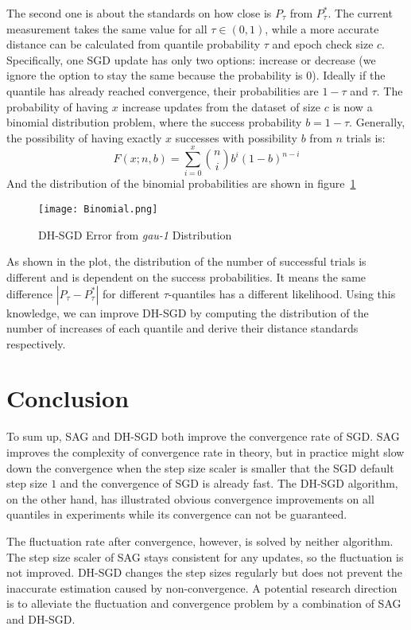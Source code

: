 The second one is about the standards on how close is $P_\tau$ from $P_\tau^*$. The current measurement takes the same value for all $\tau \in (0,1)$, while a more accurate distance can be calculated from quantile probability $\tau$ and epoch check size $c$. Specifically, one SGD update has only two options: increase or decrease (we ignore the option to stay the same because the probability is $0$). Ideally if the quantile has already reached convergence, their probabilities are $1-\tau$ and $\tau$. The probability of having $x$ increase updates from the dataset of size $c$ is now a binomial distribution problem, where the success probability $b = 1-\tau$.
Generally, the possibility of having exactly $x$ successes with possibility $b$ from $n$ trials is:
\begin{equation}
    F(x ; n,b)=\sum_{i=0}^{ x}{\binom{n}{i}} b^{i}(1-b)^{n-i}
\end{equation}
And the distribution of the binomial probabilities are shown in figure~\ref{fig: binomial}
\begin{figure}[H]
    \centering
	\texttt{[image: Binomial.png]}
    \caption{DH-SGD Error from \textit{gau-1} Distribution}
    \label{fig: binomial}
\end{figure}
As shown in the plot, the distribution of the number of successful trials is different and is dependent on the success probabilities. It means the same difference $|P_\tau - P_\tau^*|$ for different $\tau$-quantiles has a different likelihood. Using this knowledge, we can improve DH-SGD by computing the distribution of the number of increases of each quantile and derive their distance standards respectively. 

\section{Conclusion}
\label{sec: stepsize_adaptation_conclusion}

To sum up, SAG and DH-SGD both improve the convergence rate of SGD. SAG improves the complexity of convergence rate in theory, but in practice might slow down the convergence when the step size scaler is smaller that the SGD default step size $1$ and the convergence of SGD is already fast. The DH-SGD algorithm, on the other hand, has illustrated obvious convergence improvements on all quantiles in experiments while its convergence can not be guaranteed.

The fluctuation rate after convergence, however, is solved by neither algorithm. The step size scaler of SAG stays consistent for any updates, so the fluctuation is not improved. DH-SGD changes the step sizes regularly but does not prevent the inaccurate estimation caused by non-convergence. A potential research direction is to alleviate the fluctuation and convergence problem by a combination of SAG and DH-SGD.

